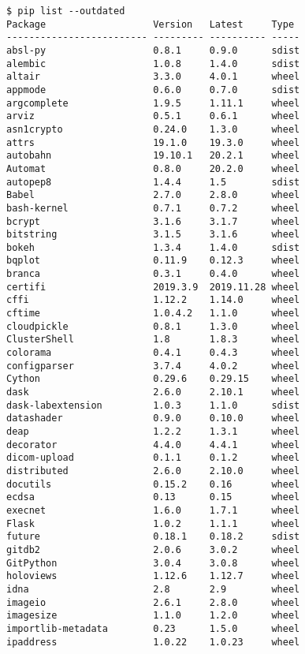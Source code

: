 \begin{verbatim}
$ pip list --outdated
Package                   Version   Latest     Type
------------------------- --------- ---------- -----
absl-py                   0.8.1     0.9.0      sdist
alembic                   1.0.8     1.4.0      sdist
altair                    3.3.0     4.0.1      wheel
appmode                   0.6.0     0.7.0      sdist
argcomplete               1.9.5     1.11.1     wheel
arviz                     0.5.1     0.6.1      wheel
asn1crypto                0.24.0    1.3.0      wheel
attrs                     19.1.0    19.3.0     wheel
autobahn                  19.10.1   20.2.1     wheel
Automat                   0.8.0     20.2.0     wheel
autopep8                  1.4.4     1.5        sdist
Babel                     2.7.0     2.8.0      wheel
bash-kernel               0.7.1     0.7.2      wheel
bcrypt                    3.1.6     3.1.7      wheel
bitstring                 3.1.5     3.1.6      wheel
bokeh                     1.3.4     1.4.0      sdist
bqplot                    0.11.9    0.12.3     wheel
branca                    0.3.1     0.4.0      wheel
certifi                   2019.3.9  2019.11.28 wheel
cffi                      1.12.2    1.14.0     wheel
cftime                    1.0.4.2   1.1.0      wheel
cloudpickle               0.8.1     1.3.0      wheel
ClusterShell              1.8       1.8.3      wheel
colorama                  0.4.1     0.4.3      wheel
configparser              3.7.4     4.0.2      wheel
Cython                    0.29.6    0.29.15    wheel
dask                      2.6.0     2.10.1     wheel
dask-labextension         1.0.3     1.1.0      sdist
datashader                0.9.0     0.10.0     wheel
deap                      1.2.2     1.3.1      wheel
decorator                 4.4.0     4.4.1      wheel
dicom-upload              0.1.1     0.1.2      wheel
distributed               2.6.0     2.10.0     wheel
docutils                  0.15.2    0.16       wheel
ecdsa                     0.13      0.15       wheel
execnet                   1.6.0     1.7.1      wheel
Flask                     1.0.2     1.1.1      wheel
future                    0.18.1    0.18.2     sdist
gitdb2                    2.0.6     3.0.2      wheel
GitPython                 3.0.4     3.0.8      wheel
holoviews                 1.12.6    1.12.7     wheel
idna                      2.8       2.9        wheel
imageio                   2.6.1     2.8.0      wheel
imagesize                 1.1.0     1.2.0      wheel
importlib-metadata        0.23      1.5.0      wheel
ipaddress                 1.0.22    1.0.23     wheel

\end{verbatim}
